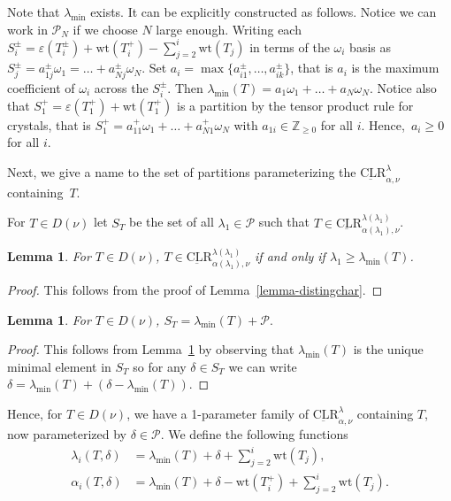 \documentclass[11pt]{article}
\newtheorem{lemma}[theo]{Lemma}
\theoremstyle{definition}
\numberwithin{equation}{section}
\newcommand{\Z}{\mathbb{Z}}
\newcommand{\Par}{\mathcal{P}}
\newcommand{\wt}{\text{wt}}
\newcommand{\CLR}{\text{CLR}}
\begin{document}
Note that $\lambda_{\min}$ exists. It can be explicitly constructed as follows. Notice we can work in $\Par_N$ if we choose $N$ large enough. Writing each $S^\pm_i = \varepsilon(T_i^\pm) + \wt(T_i^+) - \sum_{j=2}^{i} \wt(T_j)$ in terms of the $\omega_i$ basis as $S^\pm_j = a^\pm_{1 j}\omega_1 = \dots + a^\pm_{N j} \omega_{N}$. Set $a_i = \max \{a^\pm_{i 1}, \dots , a^\pm_{i k} \}$, that is $a_i$ is the maximum coefficient of $\omega_i$ across the $S^\pm_i$. Then $\lambda_{\min}(T) = a_1 \omega_1 + \dots + a_{N} \omega_{N}$. Notice also that $S_1^+ = \varepsilon(T_1^+) + \wt(T_1^+)$ is a partition by the tensor product rule for crystals, that is $S_1^+ = a^+_{11} \omega_1 + \dots + a^+_{N 1} \omega_N$ with $a_{1i} \in \Z_{\geq 0}$ for all $i$. Hence,~$a_i \geq 0$ for all $i$.

Next, we give a name to the set of partitions parameterizing the $\underbar{\CLR}^\lambda_{\alpha, \nu}$ containing~$T$. 

\begin{defn}
    For $T \in D(\nu)$ let $S_T$ be the set of all $\lambda_1 \in \Par$ such that $T \in \underbar{\CLR}^{\lambda(\lambda_1)}_{\alpha(\lambda_1), \nu}$.
\end{defn}


\begin{lemma}\label{lemma-TinCLR}
    For $T \in D(\nu)$, $T \in \underbar{\CLR}^{\lambda(\lambda_1)}_{\alpha(\lambda_1), \nu}$ if and only if $\lambda_1 \geq \lambda_{\min}(T)$.
\end{lemma}

\begin{proof}
    This follows from the proof of Lemma~\ref{lemma-distingchar}.
\end{proof}

\begin{lemma}
    For $T \in D(\nu)$, $S_T = \lambda_{\min}(T) + \Par.$
\end{lemma}

\begin{proof}
    This follows from Lemma~\ref{lemma-TinCLR} by observing that $\lambda_{\min}(T)$ is the unique minimal element in $S_T$ so for any $\delta \in S_T$ we can write $\delta = \lambda_{\min}(T) + (\delta - \lambda_{\min}(T))$.
\end{proof}


Hence, for $T \in D(\nu)$, we have a 1-parameter family of $\underbar{\CLR}^\lambda_{\alpha, \nu}$ containing $T$, now parameterized by $\delta \in \Par$. We define the following functions
\begin{align*}
\lambda_i(T, \delta) &= \lambda_{\min}(T) + \delta + \sum_{j=2}^{i} \wt(T_j), \\
\alpha_i(T, \delta) &= \lambda_{\min}(T) + \delta - \wt(T_i^+) + \sum_{j=2}^{i} \wt(T_j).
\end{align*}
\end{document}
